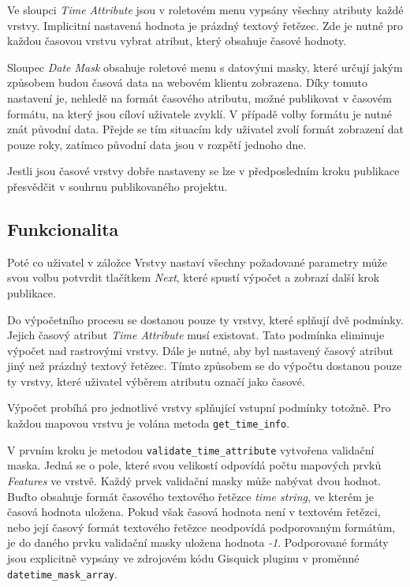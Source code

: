 Ve sloupci \textit{Time Attribute} jsou v roletovém menu vypsány všechny atributy každé vrstvy. Implicitní nastavená hodnota je prázdný textový řetězec. Zde je nutné pro každou časovou vrstvu vybrat atribut, který obsahuje časové hodnoty. 

Sloupec \textit{Date Mask} obsahuje roletové menu s datovými masky, které určují jakým způsobem budou časová data na webovém klientu zobrazena. Díky tomuto nastavení je, nehledě na formát časového atributu, možné publikovat v časovém formátu, na který jsou cíloví uživatele zvyklí. V případě volby formátu je nutné znát původní data. Přejde se tím situacím kdy uživatel zvolí formát zobrazení dat pouze roky, zatímco původní data jsou v rozpětí jednoho dne.

Jestli jsou časové vrstvy dobře nastaveny se lze v předposledním kroku publikace přesvědčit v souhrnu publikovaného projektu.

\subsection{Funkcionalita}

Poté co uživatel v záložce Vrstvy nastaví všechny požadované parametry může svou volbu potvrdit tlačítkem \textit{Next}, které spustí výpočet a zobrazí další krok publikace.

Do výpočetního procesu se dostanou pouze ty vrstvy, které splňují dvě podmínky. Jejich časový atribut \textit{Time Attribute} musí existovat. Tato podmínka eliminuje výpočet nad rastrovými vrstvy. Dále je nutné, aby byl nastavený časový atribut jiný než prázdný textový řetězec. Tímto způsobem se do výpočtu dostanou pouze ty vrstvy, které uživatel výběrem atributu označí jako časové.

Výpočet probíhá pro jednotlivé vrstvy splňující vstupní podmínky totožně. Pro každou mapovou vrstvu je volána metoda \verb|get_time_info|.

V prvním kroku je metodou \verb|validate_time_attribute| vytvořena validační maska. Jedná se o pole, které svou velikostí odpovídá počtu mapových prvků \textit{Features} ve vrstvě. Každý prvek validační masky může nabývat dvou hodnot. Buďto obsahuje formát časového textového řetězce \textit{time string}, ve kterém je časová hodnota uložena. Pokud však časová hodnota není v textovém řetězci, nebo její časový formát textového řetězce neodpovídá podporovaným formátům, je do daného prvku validační masky uložena hodnota \textit{-1}. Podporované formáty jsou explicitně vypsány ve zdrojovém kódu Gisquick pluginu v proměnné \verb|datetime_mask_array|.

